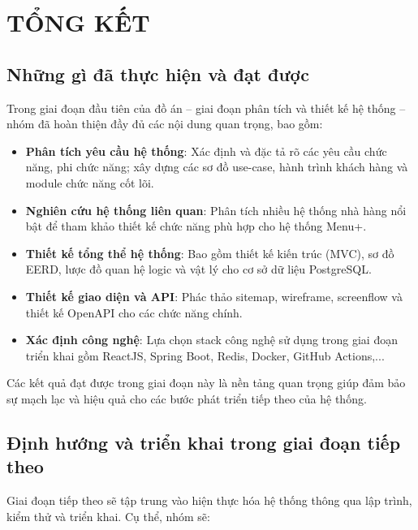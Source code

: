 \section{TỔNG KẾT}

\subsection{Những gì đã thực hiện và đạt được}

Trong giai đoạn đầu tiên của đồ án – giai đoạn phân tích và thiết kế hệ thống – nhóm đã hoàn thiện đầy đủ các nội dung quan trọng, bao gồm:

\begin{itemize}
    \item \textbf{Phân tích yêu cầu hệ thống}: Xác định và đặc tả rõ các yêu cầu chức năng, phi chức năng; xây dựng các sơ đồ use-case, hành trình khách hàng và module chức năng cốt lõi.
    \item \textbf{Nghiên cứu hệ thống liên quan}: Phân tích nhiều hệ thống nhà hàng nổi bật để tham khảo thiết kế chức năng phù hợp cho hệ thống Menu+.
    \item \textbf{Thiết kế tổng thể hệ thống}: Bao gồm thiết kế kiến trúc (MVC), sơ đồ EERD, lược đồ quan hệ logic và vật lý cho cơ sở dữ liệu PostgreSQL.
    \item \textbf{Thiết kế giao diện và API}: Phác thảo sitemap, wireframe, screenflow và thiết kế OpenAPI cho các chức năng chính.
    \item \textbf{Xác định công nghệ}: Lựa chọn stack công nghệ sử dụng trong giai đoạn triển khai gồm ReactJS, Spring Boot, Redis, Docker, GitHub Actions,...
\end{itemize}

Các kết quả đạt được trong giai đoạn này là nền tảng quan trọng giúp đảm bảo sự mạch lạc và hiệu quả cho các bước phát triển tiếp theo của hệ thống.

\subsection{Định hướng và triển khai trong giai đoạn tiếp theo}

Giai đoạn tiếp theo sẽ tập trung vào hiện thực hóa hệ thống thông qua lập trình, kiểm thử và triển khai. Cụ thể, nhóm sẽ:

